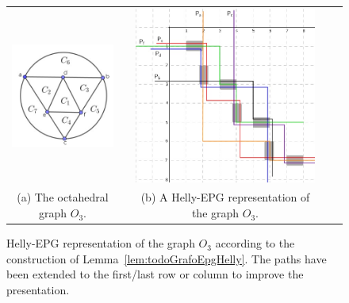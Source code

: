 
\begin{figure}[ht]
  \centering
  \begin{tabular}{c c c c c }
    \includegraphics[width=3.5cm]{./img/octaCliques} &&   
    \includegraphics[width=9cm]{./img/representacaoLB}\\
    {\footnotesize (a) The octahedral graph $O_3$.\vspace{.1cm}}&& 
    {\footnotesize (b) A Helly-EPG representation of the graph $O_3$.} 
  \end{tabular}
  \caption{Helly-EPG representation of the graph $O_3$ according to the construction of Lemma~\ref{lem:todoGrafoEpgHelly}. The paths have been extended to the first/last row or column to improve the presentation.}\label{fig:gradeDemonstracao}
\end{figure} 
 